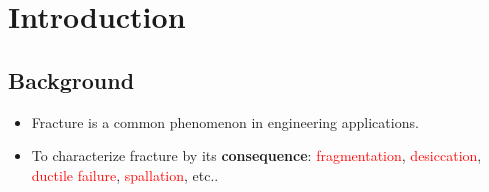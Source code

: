 \section{Introduction}

\sectioncover

\subsection{Background}

\begin{frame}
  \begin{itemize}
    \item<1-> Fracture is a common phenomenon in engineering applications.
    
    \item<2-> To characterize fracture by its \textbf{consequence}: \textcolor<3>{red}{fragmentation}, \textcolor<4>{red}{desiccation}, \textcolor<5>{red}{ductile failure}, \textcolor<6>{red}{spallation}, etc.. \\
    

\end{itemize}
\end{frame}
